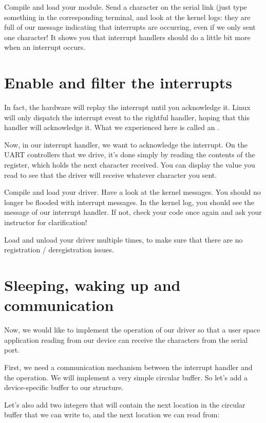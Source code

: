 Compile and load your module. Send a character on the serial link (just
type something in the corresponding  terminal, and
look at the kernel logs: they are full of our message indicating that
interrupts are occurring, even if we only sent one character! It shows
you that interrupt handlers should do a little bit more when an
interrupt occurs.

\section{Enable and filter the interrupts}

In fact, the hardware will replay the interrupt until you acknowledge
it. Linux will only dispatch the interrupt event to the rightful
handler, hoping that this handler will acknowledge it. What we
experienced here is called an .

Now, in our interrupt handler, we want to acknowledge the
interrupt. On the UART controllers that we drive, it's done simply by
reading the contents of the  register, which holds the
next character received. You can display the value you read to see
that the driver will receive whatever character you sent.

Compile and load your driver. Have a look at the kernel messages. You
should no longer be flooded with interrupt messages. In the kernel
log, you should see the message of our interrupt handler. If not,
check your code once again and ask your instructor for clarification!

Load and unload your driver multiple times, to make sure that
there are no registration / deregistration issues.

\section{Sleeping, waking up and communication}

Now, we would like to implement the  operation of our
driver so that a user space application reading from our device can
receive the characters from the serial port.

First, we need a communication mechanism between the interrupt handler
and the  operation. We will implement a very simple
circular buffer. So let's add a device-specific buffer to our
 structure.

Let's also add two integers that will contain the next location
in the circular buffer that we can write to, and the next location
we can read from:

